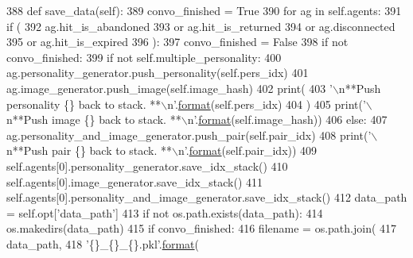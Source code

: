 \begin{DoxyCode}
388     \textcolor{keyword}{def }save\_data(self):
389         convo\_finished = \textcolor{keyword}{True}
390         \textcolor{keywordflow}{for} ag \textcolor{keywordflow}{in} self.agents:
391             \textcolor{keywordflow}{if} (
392                 ag.hit\_is\_abandoned
393                 \textcolor{keywordflow}{or} ag.hit\_is\_returned
394                 \textcolor{keywordflow}{or} ag.disconnected
395                 \textcolor{keywordflow}{or} ag.hit\_is\_expired
396             ):
397                 convo\_finished = \textcolor{keyword}{False}
398         \textcolor{keywordflow}{if} \textcolor{keywordflow}{not} convo\_finished:
399             \textcolor{keywordflow}{if} \textcolor{keywordflow}{not} self.multiple\_personality:
400                 ag.personality\_generator.push\_personality(self.pers\_idx)
401                 ag.image\_generator.push\_image(self.image\_hash)
402                 print(
403                     \textcolor{stringliteral}{'\(\backslash\)n**Push personality \{\} back to stack. **\(\backslash\)n'}.\hyperlink{namespaceparlai_1_1chat__service_1_1services_1_1messenger_1_1shared__utils_a32e2e2022b824fbaf80c747160b52a76}{format}(self.pers\_idx)
404                 )
405                 print(\textcolor{stringliteral}{'\(\backslash\)n**Push image \{\} back to stack. **\(\backslash\)n'}.\hyperlink{namespaceparlai_1_1chat__service_1_1services_1_1messenger_1_1shared__utils_a32e2e2022b824fbaf80c747160b52a76}{format}(self.image\_hash))
406             \textcolor{keywordflow}{else}:
407                 ag.personality\_and\_image\_generator.push\_pair(self.pair\_idx)
408                 print(\textcolor{stringliteral}{'\(\backslash\)n**Push pair \{\} back to stack. **\(\backslash\)n'}.\hyperlink{namespaceparlai_1_1chat__service_1_1services_1_1messenger_1_1shared__utils_a32e2e2022b824fbaf80c747160b52a76}{format}(self.pair\_idx))
409         self.agents[0].personality\_generator.save\_idx\_stack()
410         self.agents[0].image\_generator.save\_idx\_stack()
411         self.agents[0].personality\_and\_image\_generator.save\_idx\_stack()
412         data\_path = self.opt[\textcolor{stringliteral}{'data\_path'}]
413         \textcolor{keywordflow}{if} \textcolor{keywordflow}{not} os.path.exists(data\_path):
414             os.makedirs(data\_path)
415         \textcolor{keywordflow}{if} convo\_finished:
416             filename = os.path.join(
417                 data\_path,
418                 \textcolor{stringliteral}{'\{\}\_\{\}\_\{\}.pkl'}.\hyperlink{namespaceparlai_1_1chat__service_1_1services_1_1messenger_1_1shared__utils_a32e2e2022b824fbaf80c747160b52a76}{format}(

\end{DoxyCode}
